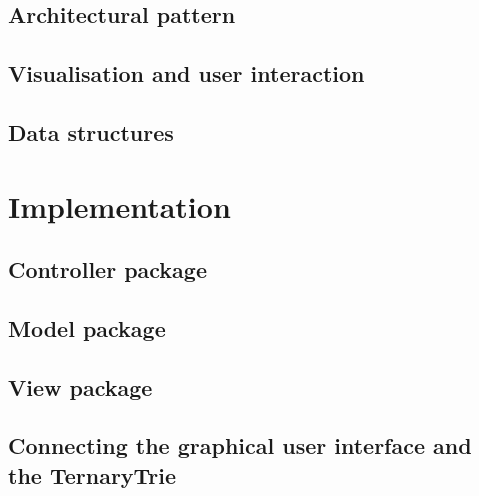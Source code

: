 \documentclass[a4paper,11pt]{article}
\begin{document}
\subsection{Architectural pattern}
\label{sub:Design Pattern}


\subsection{Visualisation and user interaction}


\subsection{Data structures}


\pagebreak
\section{Implementation}
\label{sec:Implementation}


\subsection{Controller package} %


\subsection{Model package} %


\subsection{View package} %


\subsection{Connecting the graphical user interface and the TernaryTrie}

\end{document}
